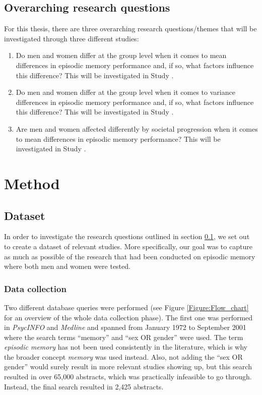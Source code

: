 \subsection{Overarching research questions} \label{Research_questions}

For this thesis, there are three overarching research questions/themes that will be investigated through three different studies:

\begin{enumerate} \item Do men and women differ at the group level when it comes to mean differences in episodic memory performance and, if so, what factors influence this difference? This will be investigated in Study . \item Do men and women differ at the group level when it comes to variance differences in episodic memory performance and, if so, what factors influence this difference? This will be investigated in Study . \item Are men and women affected differently by societal progression when it comes to mean differences in episodic memory performance? This will be investigated in Study . \end{enumerate}

\section{Method} \subsection{Dataset} \label{Dataset}

In order to investigate the research questions outlined in section \ref{Research_questions}, we set out to create a dataset of relevant studies. More specifically, our goal was to capture as much as possible of the research that had been conducted on episodic memory where both men and women were tested.

\subsubsection{Data collection} \label{Data_collection}

Two different database queries were performed (see Figure \ref{Figure:Flow_chart} for an overview of the whole data collection phase). The first one was performed in \emph{PsycINFO} and \emph{Medline} and spanned from January 1972 to September 2001 where the search terms ``memory'' and ``sex OR gender'' were used. The term \emph{episodic memory} has not been used consistently in the literature, which is why the broader concept \emph{memory} was used instead. Also, not adding the ``sex OR gender'' would surely result in more relevant studies showing up, but this search resulted in over 65,000 abstracts, which was practically infeasible to go through. Instead, the final search resulted in 2,425 abstracts.

